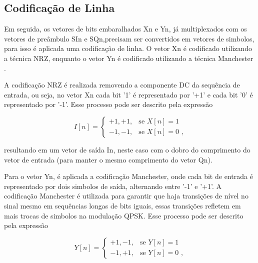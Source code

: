 \subsection{Codificação de Linha}\label{sec:line_coding}

Em seguida, os vetores de bits embaralhados \gls{Xn} e \gls{Yn}, já multiplexados com os vetores de preâmbulo \gls{SIn} e \gls{SQn},precisam ser convertidos em vetores de simbolos, para isso é aplicada uma codificação de linha. O vetor \gls{Xn} é codificado utilizando a técnica \gls{NRZ}, enquanto o vetor \gls{Yn} é codificado utilizando a técnica \gls{Manchester} \cite{cnes_services_and_message_formats_ed2_rev2_2006}.

A codificação \gls{NRZ} é realizada removendo a componente DC da sequência de entrada, ou seja, no vetor \gls{Xn} cada bit '1' é representado por '+1' e cada bit '0' é representado por '-1'. Esse processo pode ser descrito pela expressão

\begin{equation}
I[n] = 
\begin{cases}
+1, +1, & \text{se } X[n] = 1 \\
-1, -1, & \text{se } X[n] = 0 \text{ ,}
\end{cases}
\end{equation}

\noindent resultando em um vetor de saída \gls{In}, neste caso com o dobro do comprimento do vetor de entrada (para manter o mesmo comprimento do vetor \gls{Qn}). 

Para o vetor \gls{Yn}, é aplicada a codificação \gls{Manchester}, onde cada bit de entrada é representado por dois simbolos de saída, alternando entre '-1' e '+1'.  A codificação \gls{Manchester} é utilizada para garantir que haja transições de nível no sinal mesmo em sequências longas de bits iguais, essas transições refletem em mais trocas de simbolos na modulação \gls{QPSK}. Esse processo pode ser descrito pela expressão

\begin{equation}
Y[n] = 
\begin{cases}
+1,-1, & \text{se } Y[n] = 1 \\
-1,+1, & \text{se } Y[n] = 0 \text{ ,}
\end{cases}
\end{equation}

